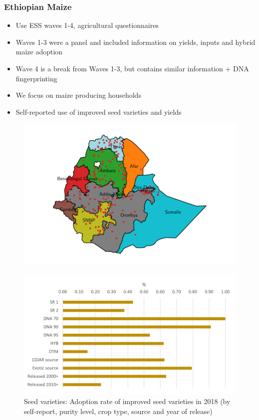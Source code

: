 \documentclass{beamer}
\begin{document}
\begin{frame}
\frametitle{Ethiopian Maize}

\begin{itemize}
    \item Use ESS waves 1-4, agricultural questionnaires
    \item Waves 1-3 were a panel and included information on yields, inputs and hybrid maize adoption
    \item Wave 4 is a break from Waves 1-3, but contains similar information $+$ DNA fingerprinting
    \item We focus on maize producing households 
    \item Self-reported use of improved seed varieties and yields
\end{itemize}

\begin{figure}
    \centering
    \includegraphics[scale=.4]{results/figures/map_hhids.pdf}
\end{figure}

\end{frame}

\begin{frame}{}

\begin{figure}
    \centering
    \includegraphics[width=.7\textwidth]{results/figures/adoption_r4.png}
    \caption{Seed varieties: Adoption rate of improved seed varieties in 2018 (by self-report, purity level, crop type, source and year of release)}
\end{figure}
    
\end{frame}
\end{document}
